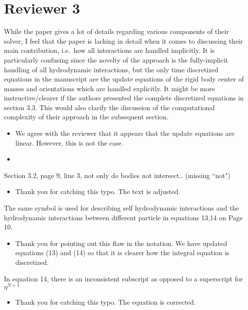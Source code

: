 \documentclass[11pt]{article}
\newcommand{\comment}[1]{{\color{blue} #1}}
\begin{document}
\section*{Reviewer 3}
\noindent
\comment{While the paper gives a lot of details regarding various
  components of their solver, I feel that the paper is lacking in detail
  when it comes to discussing their main contribution, i.e.~how all
  interactions are handled implicitly. It is particularly confusing
  since the novelty of the approach is the fully-implicit handling of
  all hydrodynamic interactions, but the only time discretized equations
  in the manuscript are the update equations of the rigid body center of
  masses and orientations which are handled explicitly. It might be more
  instructive/clearer if the authors presented the complete discretized
  equations in section 3.3. This would also clarify the discussion of
the computational complexity of their approach in the subsequent
section.}
\begin{itemize}
  \item We agree with the reviewer that it appears that the update
    equations are linear.  However, this is not the case.  

  \item {}
\end{itemize}

\noindent
\comment{Section 3.2, page 9, line 3, not only do bodies not intersect..
(missing ``not")}
\begin{itemize}
  \item Thank you for catching this typo.  The text is adjusted.
\end{itemize}

\noindent
\comment{The same symbol is used for describing self hydrodynamic
interactions and the hydrodynamic interactions between different
particle in equations 13,14 on Page 10.}
\begin{itemize}
  \item Thank you for pointing out this flaw in the notation.  We have
    updated equations (13) and (14) so that it is clearer how the
    integral equation is discretized.
\end{itemize}

\noindent
\comment{In equation 14, there is an inconsistent subscript as opposed
to a superscript for $\eta^{N+1}$}
\begin{itemize}
  \item Thank you for catching this typo.  The equation is corrected.
\end{itemize}
\end{document}
